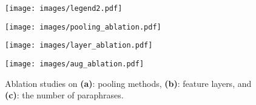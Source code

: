 \begin{figure*}[ht]
    \centering
    \texttt{[image: images/legend2.pdf]}
    \medskip    
    \begin{subcaptionbox}{\label{fig:pooling_ablation}}%
        {\texttt{[image: images/pooling\_ablation.pdf]}\vspace{-0.05in}}
    \end{subcaptionbox}
    \hfill
    \begin{subcaptionbox}{\label{fig:layer_ablation}}%
        {\texttt{[image: images/layer\_ablation.pdf]}\vspace{-0.05in}}
    \end{subcaptionbox}
    \hfill
    \begin{subcaptionbox}{\label{fig:aug_ablation}}%
        {\texttt{[image: images/aug\_ablation.pdf]}\vspace{-0.05in}}
    \end{subcaptionbox}
    \vspace{-0.1in}
    \caption{Ablation studies on \textbf{(a)}: pooling methods, \textbf{(b)}: feature layers, and \textbf{(c)}: the number of paraphrases.}
    \vspace{-0.15in}
\end{figure*}